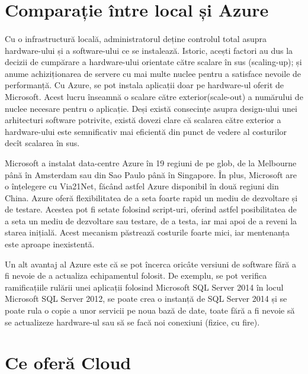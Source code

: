 \section{Comparație între local și Azure}
\vspace{1cm}
\paragraph{ } Cu o infrastructură locală, administratorul deține controlul total asupra hardware-ului și a software-ului ce se instalează. Istoric, acești factori au dus la decizii de cumpărare a hardware-ului orientate către scalare în sus (scaling-up); și anume achiziționarea de servere cu mai multe nuclee pentru a satisface nevoile de performanță. Cu Azure, se pot instala aplicații doar pe hardware-ul oferit de Microsoft. Acest lucru înseamnă o scalare către exterior(scale-out) a numărului de nuclee necesare pentru o aplicație. Deși există consecințe asupra design-ului unei arhitecturi software potrivite, există dovezi clare că scalarea către exterior a hardware-ului este semnificativ mai eficientă din punct de vedere al costurilor decît scalarea în sus.

Microsoft a instalat data-centre Azure în 19 regiuni de pe glob, de la Melbourne până în Amsterdam sau din Sao Paulo până în Singapore. În plus, Microsoft are o înțelegere cu Via21Net, făcând astfel Azure disponibil în două regiuni din China.
Azure oferă flexibilitatea de a seta foarte rapid un mediu de dezvoltare și de testare. Acestea pot fi setate folosind script-uri, oferind astfel posibilitatea de a seta un mediu de dezvoltare sau testare, de a testa, iar mai apoi de a reveni la starea inițială. Acest mecanism păstrează costurile foarte mici, iar mentenanța este aproape inexistentă.

Un alt avantaj al Azure este că se pot încerca oricâte versiuni de software fără a fi nevoie de a actualiza echipamentul folosit. De exemplu, se pot verifica ramificațiile rulării unei aplicații folosind Microsoft SQL Server 2014 în locul Microsoft SQL Server 2012, se poate crea o instanță de SQL Server 2014 și se poate rula o copie a unor servicii pe noua bază de date, toate fără a fi nevoie să se actualizeze hardware-ul sau să se facă noi conexiuni (fizice, cu fire).\cite{20}

\section{Ce oferă Cloud}
\vspace{1cm}
